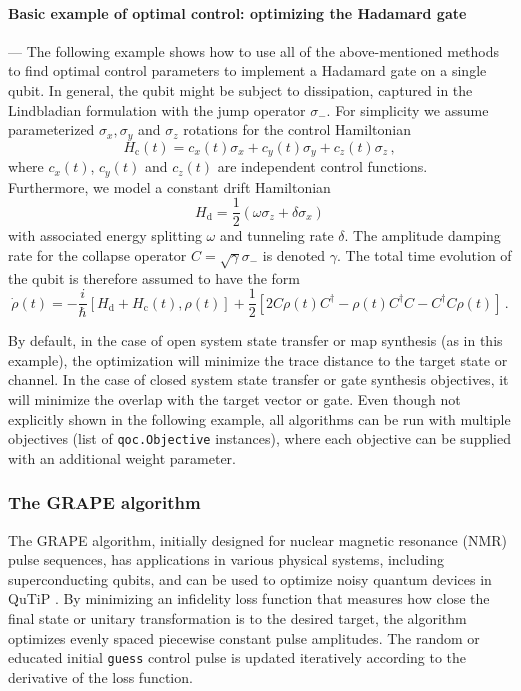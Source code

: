\documentclass[preprint,3p,sort&compress]{elsarticle}
\def\code#1{\texttt{#1}}
\begin{document}
\paragraph{Basic example of optimal control: optimizing the Hadamard gate} --- The following example shows how to use all of the above-mentioned methods to find optimal control parameters to implement a Hadamard gate on a single qubit. 
In general, the qubit might be subject to dissipation, captured in the Lindbladian formulation with the jump operator $\sigma_-$.
For simplicity we assume parameterized $\sigma_x, \sigma_y$ and $\sigma_z$ rotations for the control Hamiltonian
\begin{equation} \label{eq:qoc_hamil}
    H_\mathrm{c}(t) = c_x(t) \sigma_x + c_y(t) \sigma_y + c_z(t) \sigma_z \, ,
\end{equation}
where $c_x(t)$, $c_y(t)$ and $c_z(t)$ are independent control functions.
Furthermore, we model a constant drift Hamiltonian
\begin{equation}
    H_\mathrm{d} = \frac{1}{2} (\omega \sigma_z + \delta \sigma_x)
\end{equation}
with associated energy splitting $\omega$ and tunneling rate $\delta$. The amplitude damping rate for the collapse operator $C=\sqrt{\gamma}\sigma_-$ is denoted $\gamma$.
The total time evolution of the qubit is therefore assumed to have the form
\begin{equation}
    \dot \rho(t) = -\frac{i}{\hbar} [H_\mathrm{d} + H_\mathrm{c}(t), \rho(t)] + \frac{1}{2} \left[ 2 C \rho(t) C^\dagger - \rho(t) C^\dagger C - C^\dagger C \rho(t)\right] \, .
\end{equation}

By default, in the case of open system state transfer or map synthesis (as in this example), the optimization will minimize the trace distance to the target state or channel. In the case of closed system state transfer or gate synthesis objectives, it will minimize the overlap with the target vector or gate.
Even though not explicitly shown in the following example, all algorithms can be run with multiple objectives (list of \code{qoc.Objective} instances), where each objective can be supplied with an additional weight parameter.


\subsubsection{The GRAPE algorithm} 
The GRAPE algorithm, initially designed for nuclear magnetic resonance (NMR) pulse sequences, has applications in various physical systems, including superconducting qubits, and can be used to optimize noisy quantum devices in QuTiP \cite{grape, grape_sc, li2021pulselevel}. 
By minimizing an infidelity loss function that measures how close the final state or unitary transformation is to the desired target, the algorithm optimizes evenly spaced piecewise constant pulse amplitudes. 
The random or educated initial \code{guess} control pulse is updated iteratively according to the derivative of the loss function.
\end{document}
